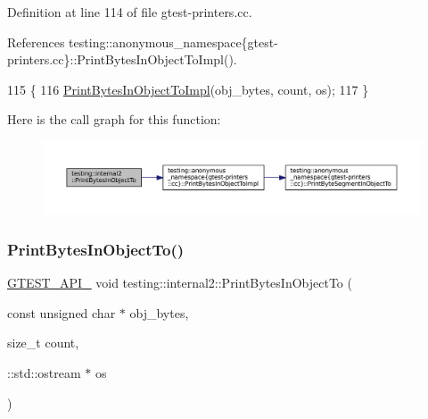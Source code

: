 Definition at line 114 of file gtest-\/printers.\+cc.



References testing\+::anonymous\+\_\+namespace\{gtest-\/printers.\+cc\}\+::\+Print\+Bytes\+In\+Object\+To\+Impl().


\begin{DoxyCode}
115                                        \{
116   \hyperlink{namespacetesting_1_1anonymous__namespace_02gtest-printers_8cc_03_a7c3551691f3b4ab868eb5b8ceba41bde}{PrintBytesInObjectToImpl}(obj\_bytes, count, os);
117 \}
\end{DoxyCode}
Here is the call graph for this function\+:
\nopagebreak
\begin{figure}[H]
\begin{center}
\leavevmode
\includegraphics[width=350pt]{namespacetesting_1_1internal2_abfb9aa80365f93b952e9a4bea09947a8_cgraph}
\end{center}
\end{figure}
\mbox{\label{namespacetesting_1_1internal2_a9fbf8e07c0f94dc74d6ef5e56cd3c553}} 
\subsubsection{\texorpdfstring{Print\+Bytes\+In\+Object\+To()}{PrintBytesInObjectTo()}\hspace{0.1cm}{\footnotesize\ttfamily [2/2]}}
{\footnotesize\ttfamily \hyperlink{gtest-port_8h_aa73be6f0ba4a7456180a94904ce17790}{G\+T\+E\+S\+T\+\_\+\+A\+P\+I\+\_\+} void testing\+::internal2\+::\+Print\+Bytes\+In\+Object\+To (\begin{DoxyParamCaption}\item[{const unsigned char $\ast$}]{obj\+\_\+bytes,  }\item[{size\+\_\+t}]{count,  }\item[{\+::std\+::ostream $\ast$}]{os }\end{DoxyParamCaption})}




